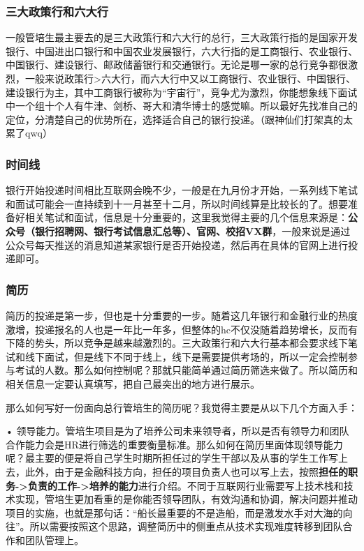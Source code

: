 \subsubsection{三大政策行和六大行}

一般管培生最主要去的是三大政策行和六大行的总行，三大政策行指的是国家开发银行、中国进出口银行和中国农业发展银行，六大行指的是工商银行、农业银行、中国银行、建设银行、邮政储蓄银行和交通银行。无论是哪一家的总行竞争都很激烈，一般来说政策行>六大行，而六大行中又以工商银行、农业银行、中国银行、建设银行为主，其中工商银行被称为“宇宙行”，竞争尤为激烈，你能想象线下面试中一个组十个人有牛津、剑桥、哥大和清华博士的感觉嘛。所以最好先找准自己的定位，分清楚自己的优势所在，选择适合自己的银行投递。（跟神仙们打架真的太累了qwq）

\subsubsection{时间线}

银行开始投递时间相比互联网会晚不少，一般是在九月份才开始，一系列线下笔试和面试可能会一直持续到十一月甚至十二月，所以时间线算是比较长的了。想要准备好相关笔试和面试，信息是十分重要的，这里我觉得主要的几个信息来源是：\textbf{公众号（银行招聘网、银行考试信息汇总等）、官网、校招VX群}，一般来说是通过公众号每天推送的消息知道某家银行是否开始投递，然后再在具体的官网上进行投递即可。

\subsubsection{简历}

简历的投递是第一步，但也是十分重要的一步。随着这几年银行和金融行业的热度激增，投递报名的人也是一年比一年多，但整体的hc不仅没随着趋势增长，反而有下降的势头，所以竞争是越来越激烈的。三大政策行和六大行基本都会要求线下笔试和线下面试，但是线下不同于线上，线下是需要提供考场的，所以一定会控制参与考试的人数。那么如何控制呢？那就只能简单通过简历筛选来做了。所以简历和相关信息一定要认真填写，把自己最突出的地方进行展示。

那么如何写好一份面向总行管培生的简历呢？我觉得主要是从以下几个方面入手：

•	领导能力。管培生项目是为了培养公司未来领导者，所以是否有领导力和团队合作能力会是HR进行筛选的重要衡量标准。那么如何在简历里面体现领导能力呢？最主要的便是将自己学生时期所担任过的学生干部以及从事的学生工作写上去，此外，由于是金融科技方向，担任的项目负责人也可以写上去，按照\textbf{担任的职务->负责的工作->培养的能力}进行介绍。不同于互联网行业需要写上技术栈和技术实现，管培生更加看重的是你能否领导团队，有效沟通和协调，解决问题并推动项目的实施，也就是那句话：“船长最重要的不是造船，而是激发水手对大海的向往”。所以需要按照这个思路，调整简历中的侧重点从技术实现难度转移到团队合作和团队管理上。

